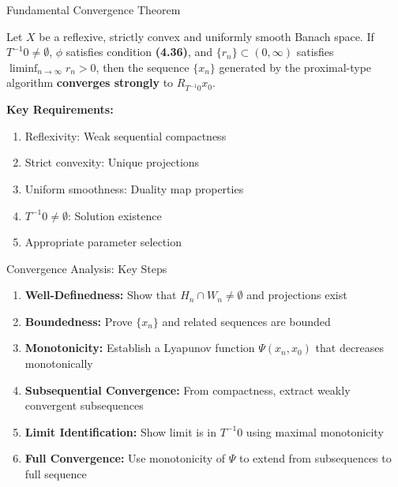 \documentclass[aspectratio=169,10pt]{beamer}
\begin{document}
\begin{frame}{Fundamental Convergence Theorem}
    \begin{theorem}
        Let $X$ be a reflexive, strictly convex and uniformly smooth Banach space.
        If $T^{-1}0 \neq \emptyset$, $\phi$ satisfies condition \textbf{(4.36)}, and
        $\{r_n\} \subset (0, \infty)$ satisfies $\liminf_{n \to \infty} r_n > 0$,
        then the sequence $\{x_n\}$ generated by the proximal-type algorithm
        \textbf{converges strongly} to $R_{T^{-1}0} x_0$.
    \end{theorem}

    \vspace{0.3cm}
    \textbf{Key Requirements:}
    \begin{enumerate}
        \item Reflexivity: Weak sequential compactness
        \item Strict convexity: Unique projections
        \item Uniform smoothness: Duality map properties
        \item $T^{-1}0 \neq \emptyset$: Solution existence
        \item Appropriate parameter selection
    \end{enumerate}
\end{frame}

\begin{frame}{Convergence Analysis: Key Steps}
    \begin{enumerate}
        \item \textbf{Well-Definedness:} Show that $H_n \cap W_n \neq \emptyset$ and
              projections exist

        \item \textbf{Boundedness:} Prove $\{x_n\}$ and related sequences are bounded

        \item \textbf{Monotonicity:} Establish a Lyapunov function $\Psi(x_n, x_0)$
              that decreases monotonically

        \item \textbf{Subsequential Convergence:} From compactness, extract weakly
              convergent subsequences

        \item \textbf{Limit Identification:} Show limit is in $T^{-1}0$ using
              maximal monotonicity

        \item \textbf{Full Convergence:} Use monotonicity of $\Psi$ to extend from
              subsequences to full sequence
    \end{enumerate}
\end{frame}
\end{document}
